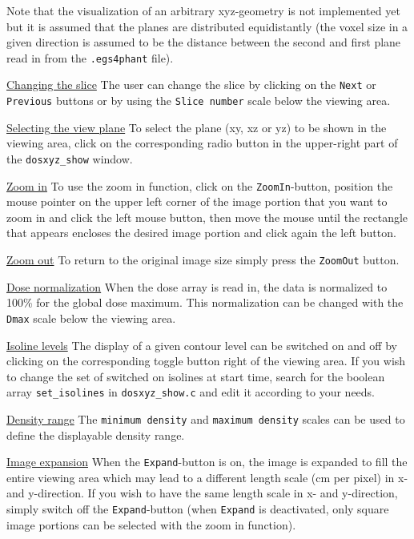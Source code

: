 \documentclass[12pt]{article}
\begin{document}
\noindent
Note that the visualization of an arbitrary xyz-geometry
is not implemented yet but it is assumed that the planes
are distributed equidistantly (the voxel size in
a given direction is assumed to be the distance between
the second and first plane read in from the {\tt .egs4phant} file).

\noindent
\underline{\sffamily Changing the slice}
The user can change the slice by clicking on the
{\tt Next} or {\tt Previous} buttons or by using
the {\tt Slice number} scale below the viewing area.

\noindent
\underline{\sffamily Selecting the view plane}
To select the plane
(xy, xz or yz) to be shown in the viewing area, click
on the corresponding radio button in the upper-right part
of the {\tt dosxyz\_show} window.

\noindent
\underline{\sffamily Zoom in}
To use the zoom in function, click on
the {\tt ZoomIn}-button, position the mouse pointer on
the upper left corner of the image portion that you want to
zoom in and click the left mouse button, then move the
mouse until the rectangle that appears encloses the desired
image portion and click again the left button.

\noindent
\underline{\sffamily Zoom out}
To return to
the original image size simply press the {\tt ZoomOut} button.

\noindent
\underline{\sffamily Dose normalization}
When the dose array is read in, the data is normalized
to 100\% for the global dose maximum. This normalization
can be changed with the {\tt Dmax} scale below the viewing area.

\noindent
\underline{\sffamily Isoline levels}
The display of a given contour level can be switched on and off by
clicking on the corresponding toggle button right of the viewing
area. If you wish to change the set of switched on isolines at
start time, search for the boolean array {\tt set\_isolines} in
{\tt dosxyz\_show.c} and edit it according to your needs.

\noindent
\underline{\sffamily Density range}
The {\tt minimum density} and {\tt maximum density} scales
can be used to define the displayable density range.

\noindent
\underline{\sffamily Image expansion}
When the {\tt Expand}-button is on, the image is expanded to
fill the entire viewing area which may lead to a different
length scale (cm per pixel) in x- and y-direction. If you
wish to have the same length scale in x- and y-direction, simply
switch off the {\tt Expand}-button (when {\tt Expand} is deactivated,
only square image portions can be selected with the zoom in function).
\end{document}
